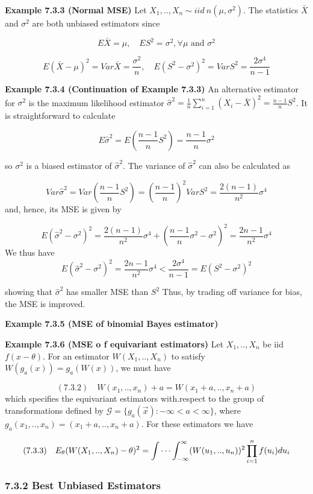 \documentclass[6pt,twocolumn,Portrait]{article}
\begin{document}
\textbf{Example 7.3.3 (Normal MSE)} Let
\(X_1,..,X_n\sim iid\ n(\mu,\sigma^2)\). The statistics \(\bar X\) and
\(\sigma^2\) are both unbiased estimators since

\[E\bar X=\mu,\quad ES^2=\sigma^2, \forall\mu \text{ and } \sigma^2\]

\[E(\bar X-\mu)^2=Var\bar X=\frac{\sigma^2}{n},\quad E(S^2-\sigma^2)^2=VarS^2=\frac{2\sigma^4}{n-1}\]

\textbf{Example 7.3.4 (Continuation of Example 7.3.3)} An alternative
estimator for \(\sigma^2\) is the maximum likelihood estimator
\(\hat\sigma^2=\frac1n\sum_{i=1}^n(X_i-\bar X)^2=\frac{n-1}nS^2\). It is
straightforward to calculate

\[E\hat\sigma^2=E\left(\frac{n-1}nS^2\right)=\frac{n-1}n\sigma^2\]

so \(\sigma^2\) is a biased estimator of \(\hat\sigma^2\). The variance
of \(\hat\sigma^2\) can also be calculated as

\[Var\hat\sigma^2=Var\left(\frac{n-1}nS^2\right)=\left(\frac{n-1}n\right)^2VarS^2=\frac{2(n-1)}{n^2}\sigma^4\]
and, hence, its MSE is given by

\[E(\hat\sigma^2-\sigma^2)^2=\frac{2(n-1)}{n^2}\sigma^4+\left(\frac{n-1}n\sigma^2-\sigma^2\right)^2=\frac{2n-1}{n^2}\sigma^4\]
We thus have
\[E(\hat\sigma^2-\sigma^2)^2=\frac{2n-1}{n^2}\sigma^4<\frac{2\sigma^4}{n-1}=E(S^2-\sigma^2)^2\]

showing that \(\hat\sigma^2\) has smaller MSE than \(S^2\) Thus, by
trading off variance for bias, the MSE is improved.

\textbf{Example 7.3.5 (MSE of binomial Bayes estimator)}

\textbf{Example 7.3.6 (MSE o f equivariant estimators)} Let
\(X_1,..,X_n\) be iid \(f(x-\theta)\). For an estimator
\(W(X_1,..,X_n)\) to satisfy \(W(g_a(x))=g_a(W(x))\), we must have

\[(7.3.2)\quad W(x_1,..,x_n)+a=W(x_1+a,..,x_n+a)\] which specifies the
equivariant estimators with.respect to the group of transformations
defined by \(\mathcal{G}=\{g_a(\vec x):-\infty<a<\infty\}\), where
\(g_a(x_1,..,x_n)=(x_1+a,..,x_n+a)\). For these estimators we have

\[(7.3.3)\quad E_\theta(W(X_1,..,X_n)-\theta)^2=\idotsint^\infty_{-\infty}(W(u_1,..,u_n))^2\prod^n_{i=1}f(u_i)du_i\]

\hypertarget{best-unbiased-estimators}{%
\subsubsection{7.3.2 Best Unbiased
Estimators}\label{best-unbiased-estimators}}
\end{document}
